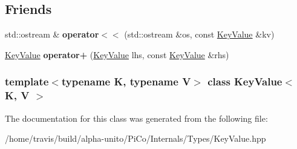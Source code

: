 \subsection*{\-Friends}
\begin{DoxyCompactItemize}
\item 
\hypertarget{class_key_value_a39c082a850561b5283e7bf5858a88cac}{std\-::ostream \& {\bfseries operator$<$$<$} (std\-::ostream \&os, const \hyperlink{class_key_value}{\-Key\-Value} \&kv)}\label{class_key_value_a39c082a850561b5283e7bf5858a88cac}

\item 
\hypertarget{class_key_value_a60405bd4e3c6371f045b28bb6100c58b}{\hyperlink{class_key_value}{\-Key\-Value} {\bfseries operator+} (\hyperlink{class_key_value}{\-Key\-Value} lhs, const \hyperlink{class_key_value}{\-Key\-Value} \&rhs)}\label{class_key_value_a60405bd4e3c6371f045b28bb6100c58b}

\end{DoxyCompactItemize}
\subsubsection*{template$<$typename K, typename V$>$ class Key\-Value$<$ K, V $>$}



\-The documentation for this class was generated from the following file\-:\begin{DoxyCompactItemize}
\item 
/home/travis/build/alpha-\/unito/\-Pi\-Co/\-Internals/\-Types/\-Key\-Value.\-hpp\end{DoxyCompactItemize}
